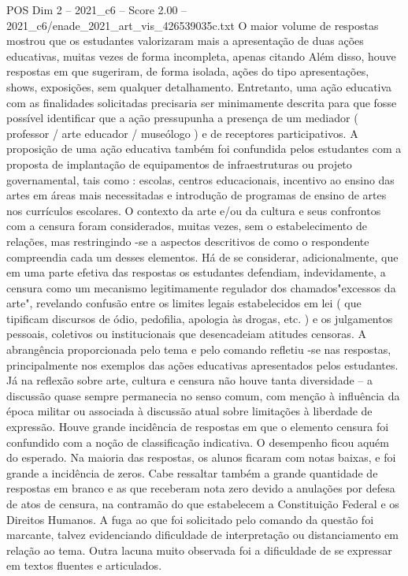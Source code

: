 \begin{textsample}{POS Dim 2 – 2021\_c6 – Score 2.00 – 2021\_c6/enade\_2021\_art\_vis\_426539035c.txt}
O maior volume de respostas mostrou que os estudantes valorizaram mais a apresentação de duas ações educativas, muitas vezes de forma incompleta, apenas citando Além disso, houve respostas em que sugeriram, de forma isolada, ações do tipo apresentações, shows, exposições, sem qualquer detalhamento.
Entretanto, uma ação educativa com as finalidades solicitadas precisaria ser minimamente descrita para que fosse possível identificar que a ação pressupunha a presença de um mediador ( professor / arte educador / museólogo ) e de receptores participativos.
A proposição de uma ação educativa também foi confundida pelos estudantes com a proposta de implantação de equipamentos de infraestruturas ou projeto governamental, tais como : escolas, centros educacionais, incentivo ao ensino das artes em áreas mais necessitadas e introdução de programas de ensino de artes nos currículos escolares.
O contexto da arte e/ou da cultura e seus confrontos com a censura foram considerados, muitas vezes, sem o estabelecimento de relações, mas restringindo -se a aspectos descritivos de como o respondente compreendia cada um desses elementos.
Há de se considerar, adicionalmente, que em uma parte efetiva das respostas os estudantes defendiam, indevidamente, a censura como um mecanismo legitimamente regulador dos chamados"excessos da arte", revelando confusão entre os limites legais estabelecidos em lei ( que tipificam discursos de ódio, pedofilia, apologia às drogas, etc. ) e os julgamentos pessoais, coletivos ou institucionais que desencadeiam atitudes censoras.
A abrangência proporcionada pelo tema e pelo comando refletiu -se nas respostas, principalmente nos exemplos das ações educativas apresentados pelos estudantes.
Já na reflexão sobre arte, cultura e censura não houve tanta diversidade – a discussão quase sempre permanecia no senso comum, com menção à influência da época militar ou associada à discussão atual sobre limitações à liberdade de expressão.
Houve grande incidência de respostas em que o elemento censura foi confundido com a noção de classificação indicativa.
O desempenho ficou aquém do esperado.
Na maioria das respostas, os alunos ficaram com notas baixas, e foi grande a incidência de zeros.
Cabe ressaltar também a grande quantidade de respostas em branco e as que receberam nota zero devido a anulações por defesa de atos de censura, na contramão do que estabelecem a Constituição Federal e os Direitos Humanos.
A fuga ao que foi solicitado pelo comando da questão foi marcante, talvez evidenciando dificuldade de interpretação ou distanciamento em relação ao tema.
Outra lacuna muito observada foi a dificuldade de se expressar em textos fluentes e articulados.

\end{textsample}
